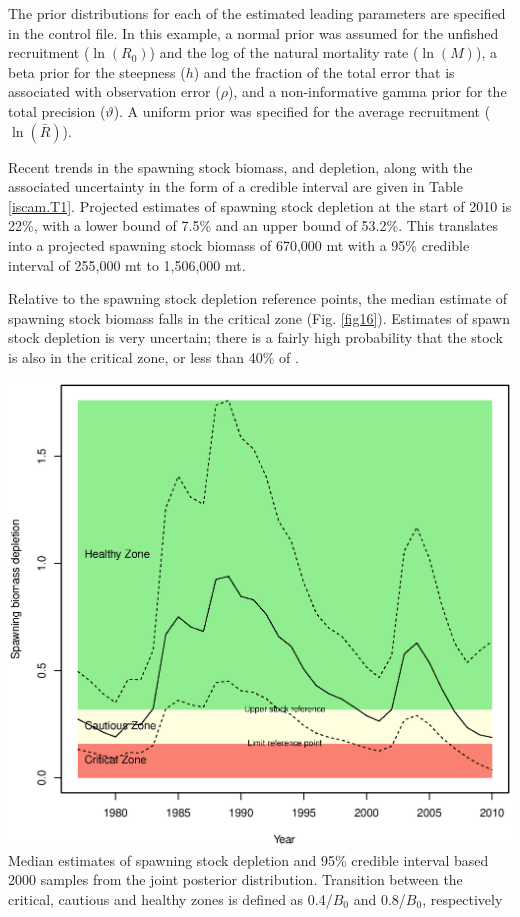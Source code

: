 \begin{multicols}{2}
The prior distributions for each of the estimated leading parameters are specified in the control file.  In this example, a normal prior was assumed for the unfished recruitment ($\ln(R_0)$) and the log of the natural mortality rate ($\ln(M)$), a beta prior for the steepness ($h$) and the fraction of the total error that is associated with observation error ($\rho$), and a non-informative gamma prior for the total precision ($\vartheta$).  A uniform prior was specified for the average recruitment ($\ln(\bar{R})$).

Recent trends in the spawning stock biomass, and depletion, along with the associated uncertainty in the form of a credible interval are given in Table \ref{iscam.T1}.  Projected estimates of spawning stock depletion at the start of 2010 is 22\%, with a lower bound of 7.5\% and an upper bound of 53.2\%.  This translates into a projected spawning stock biomass of 670,000 mt with a 95\% credible interval of 255,000 mt to 1,506,000 mt.

\begin{tiny}

\end{tiny}

Relative to the spawning stock depletion reference points, the median estimate of spawning stock biomass falls in the critical zone (Fig. \ref{fig16}).  Estimates of spawn stock depletion is very uncertain; there is a fairly high probability that the stock is also in the critical zone, or less than 40\% of \bmsy.

\begin{figurehere}
	\centering
	\includegraphics[width=0.9\columnwidth]{iscamFigs/phakefig12.eps}\\
	\caption{Median estimates of spawning stock depletion and 95\% credible interval based 2000 samples from the joint posterior distribution. Transition between the critical, cautious and healthy zones is defined as 0.4\bmsy/$B_0$ and 0.8\bmsy/$B_0$, respectively }\label{fig16}
\end{figurehere}


\end{multicols}
